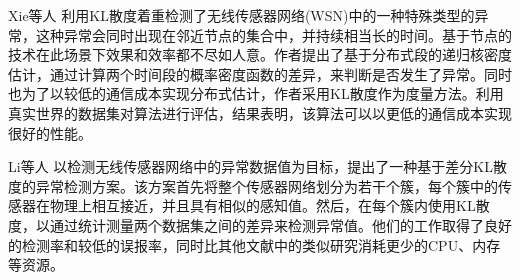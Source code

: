 Xie等人\cite{xie2016distributed} 利用KL散度着重检测了无线传感器网络(WSN)中的一种特殊类型的异常，这种异常会同时出现在邻近节点的集合中，并持续相当长的时间。基于节点的技术在此场景下效果和效率都不尽如人意。作者提出了基于分布式段的递归核密度估计，通过计算两个时间段的概率密度函数的差异，来判断是否发生了异常。同时也为了以较低的通信成本实现分布式估计，作者采用KL散度作为度量方法。利用真实世界的数据集对算法进行评估，结果表明，该算法可以以更低的通信成本实现很好的性能。

Li等人\cite{li2012differential} 以检测无线传感器网络中的异常数据值为目标，提出了一种基于差分KL散度的异常检测方案。该方案首先将整个传感器网络划分为若干个簇，每个簇中的传感器在物理上相互接近，并且具有相似的感知值。然后，在每个簇内使用KL散度，以通过统计测量两个数据集之间的差异来检测异常值。他们的工作取得了良好的检测率和较低的误报率，同时比其他文献中的类似研究消耗更少的CPU、内存等资源。










